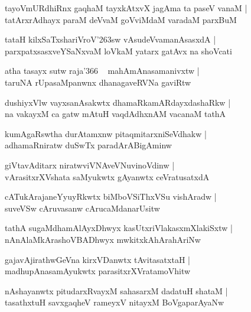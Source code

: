 \documentclass[twoside,12pt,openright]{book}
\def\S{\char'263}
\newcounter{shloka}[chapter]
\begin{document}
\begin{shloka}
tayoVmURdhiRnx gaqhaM tayxkAtxvX  jagAma ta paseV vanaM |\\
tatArxrAdhayx paraM deVvaM goVviMdaM varadaM parxBuM 
\end{shloka}

\begin{shloka}
tataH kilxSaTxshariVroV\S sw vAsudeVvamanAsasxdA |\\
parxpatxsasxveYSaNxvaM loVkaM yatarx gatAvx na shoVcati 
\end{shloka}

\begin{shloka}
atha tasayx sutw raja\char'366 ~ mahAmAnasamanivxtw |\\
taruNA rUpasaMpanwnx dhanagaveRVNa gaviRtw 
\end{shloka}

\begin{shloka}
dushiyxVlw vayxsanAsakwtx dhamaRkamARdayxdashaRkw |\\
na vakayxM ca gatw mAtuH vaqdAdhxnAM vacanaM tathA 
\end{shloka}

\begin{shloka}
kumAgaRswtha durAtamxnw pitaqmitarxniSeVdhakw |\\
adhamaRniratw duSwTx paradArABigAminw 
\end{shloka}

\begin{shloka}
giVtavAditarx niratwviVNAveVNuvinoVdinw |\\
vArasitxrXVshata saMyukwtx gAyanwtx ceVratusatxdA 
\end{shloka}

\begin{shloka}
cATukArajaneYyuyRkwtx biMboVSiThxVSu vishAradw |\\
suveVSw cAruvasanw cArucaMdanarUsitw
\end{shloka}

\begin{shloka}
tathA sugaMdhamAlAyxDhwyx kasUtxriVlakasxmXlakiSxtw |\\
nAnAlaMkArashoVBADhwyx mwkitxkAhArahAriNw
\end{shloka}

\begin{shloka}
gajavAjirathwGeVna kirxVDanwtx tAvitasatxtaH |\\
madhupAnasamAyukwtx parasitxrXVratamoVhitw
\end{shloka}

\begin{shloka}
nAshayanwtx pitudarxRvayxM sahasarxM dadatuH shataM |\\
tasathxtuH savxgaqheV rameyxV nitayxM BoVgaparAyaNw 
\end{shloka}
\end{document}
